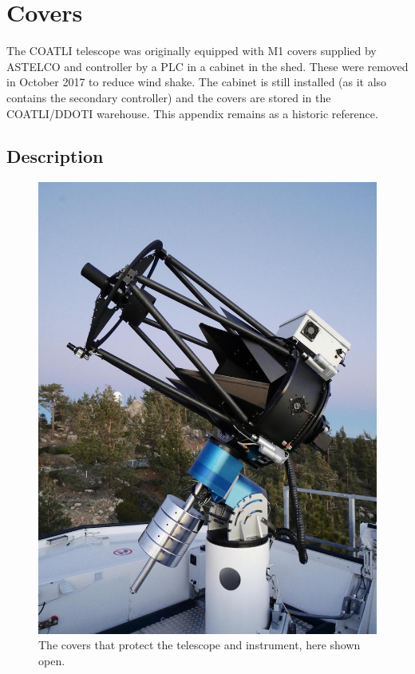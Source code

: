 \chapter{Covers}
\label{appendix:covers}

The COATLI telescope was originally equipped with M1 covers supplied by ASTELCO and controller by a PLC in a cabinet in the shed. These were removed in October 2017 to reduce wind shake. The cabinet is still installed (as it also contains the secondary controller) and the covers are stored in the COATLI/DDOTI warehouse. This appendix remains as a historic reference.

\section{Description}

\begin{figure}
\begin{center}
\includegraphics[width=0.8\linewidth]{figures/covers-open.jpg}
\end{center}
\caption{The covers that protect the telescope and instrument, here shown open.}
\label{figure:covers-open}
\end{figure}

